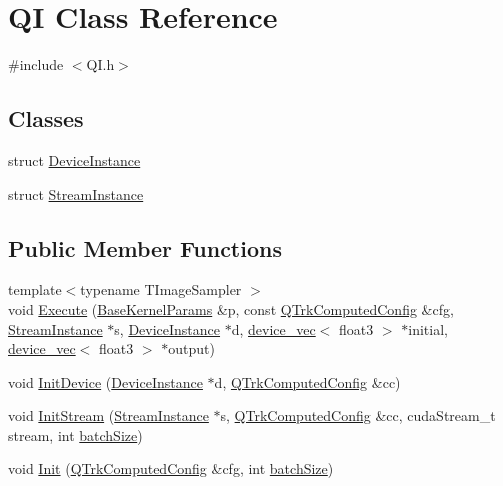 \hypertarget{class_q_i}{}\section{QI Class Reference}
\label{class_q_i}


{\ttfamily \#include $<$Q\+I.\+h$>$}

\subsection*{Classes}
\begin{DoxyCompactItemize}
\item 
struct \hyperlink{struct_q_i_1_1_device_instance}{Device\+Instance}
\item 
struct \hyperlink{struct_q_i_1_1_stream_instance}{Stream\+Instance}
\end{DoxyCompactItemize}
\subsection*{Public Member Functions}
\begin{DoxyCompactItemize}
\item 
{\footnotesize template$<$typename T\+Image\+Sampler $>$ }\\void \hyperlink{class_q_i_a084274d952e1430627110818f398a3d4}{Execute} (\hyperlink{struct_base_kernel_params}{Base\+Kernel\+Params} \&p, const \hyperlink{struct_q_trk_computed_config}{Q\+Trk\+Computed\+Config} \&cfg, \hyperlink{struct_q_i_1_1_stream_instance}{Stream\+Instance} $\ast$s, \hyperlink{struct_q_i_1_1_device_instance}{Device\+Instance} $\ast$d, \hyperlink{classdevice__vec}{device\+\_\+vec}$<$ float3 $>$ $\ast$initial, \hyperlink{classdevice__vec}{device\+\_\+vec}$<$ float3 $>$ $\ast$output)
\item 
void \hyperlink{class_q_i_a20a5d23a269c8c5cc1dcce1f5d931e20}{Init\+Device} (\hyperlink{struct_q_i_1_1_device_instance}{Device\+Instance} $\ast$d, \hyperlink{struct_q_trk_computed_config}{Q\+Trk\+Computed\+Config} \&cc)
\item 
void \hyperlink{class_q_i_ae560c53ae31c70ca9a1d6a0a745c75ee}{Init\+Stream} (\hyperlink{struct_q_i_1_1_stream_instance}{Stream\+Instance} $\ast$s, \hyperlink{struct_q_trk_computed_config}{Q\+Trk\+Computed\+Config} \&cc, cuda\+Stream\+\_\+t stream, int \hyperlink{class_q_i_aa7bd10a94c9128943ff9f1775614f704}{batch\+Size})
\item 
void \hyperlink{class_q_i_a4d2c72e4f110d37299c01da8480671f4}{Init} (\hyperlink{struct_q_trk_computed_config}{Q\+Trk\+Computed\+Config} \&cfg, int \hyperlink{class_q_i_aa7bd10a94c9128943ff9f1775614f704}{batch\+Size})
\end{DoxyCompactItemize}
